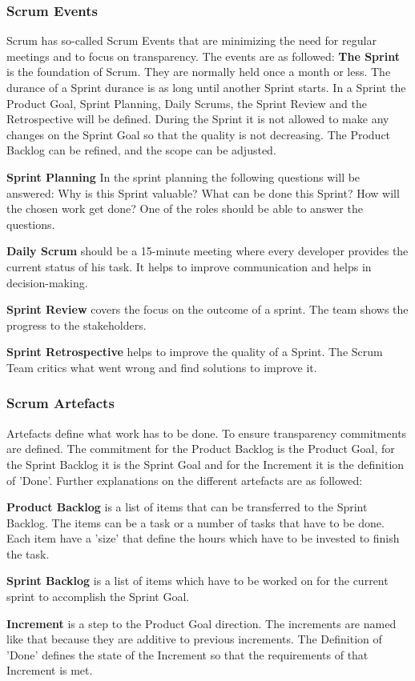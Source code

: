\subsubsection{Scrum Events} \label{sec:Scrum Events}
Scrum has so-called Scrum Events that are minimizing the need for regular meetings and to focus on transparency. The events are as followed:
\textbf{The Sprint} is the foundation of Scrum. They are normally held once a month or less. The durance of a Sprint durance is as long until another Sprint starts. In a Sprint the Product Goal, Sprint Planning, Daily Scrums, the Sprint Review and the Retrospective will be defined. During the Sprint it is not allowed to make any changes on the Sprint Goal so that the quality is not decreasing. The Product Backlog can be refined, and the scope can be adjusted. \cite{scrum_guide}

\textbf{Sprint Planning} In the sprint planning the following questions will be answered: Why is this Sprint valuable? What can be done this Sprint? How will the chosen work get done? One of the roles should be able to answer the questions. \cite{scrum_guide}

\textbf{Daily Scrum} should be a 15-minute meeting where every developer provides the current status of his task. It helps to improve communication and helps in decision-making. \cite{scrum_guide}

\textbf{Sprint Review} covers the focus on the outcome of a sprint. The team shows the progress to the stakeholders. \cite{scrum_guide}

\textbf{Sprint Retrospective} helps to improve the quality of a Sprint. The Scrum Team critics what went wrong and find solutions to improve it. \cite{scrum_guide}

\subsubsection{Scrum Artefacts} \label{sec:Scrum Artefacts}

Artefacts define what work has to be done. To ensure transparency commitments are defined. The commitment for the Product Backlog is the Product Goal, for the Sprint Backlog it is the Sprint Goal and for the Increment it is the definition of 'Done'. Further explanations on the different artefacts are as followed: \cite{scrum_guide}

\textbf{Product Backlog} is a list of items that can be transferred to the Sprint Backlog. The items can be a task or a number of tasks that have to be done. Each item have a 'size' that define the hours which have to be invested to finish the task. \cite{scrum_guide}

\textbf{Sprint Backlog} is a list of items which have to be worked on for the current sprint to accomplish the Sprint Goal. \cite{scrum_guide}

\textbf{Increment} is a step to the Product Goal direction. The increments are named like that because they are additive to previous increments. The Definition of 'Done' defines the state of the Increment so that the requirements of that Increment is met. \cite{scrum_guide}